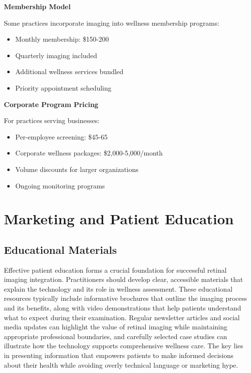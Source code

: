 \documentclass[
  Letterpaper,
]{scrbook}
\providecommand{\tightlist}{%
  \setlength{\itemsep}{0pt}\setlength{\parskip}{0pt}}\usepackage{longtable,booktabs,array}
\begin{document}
\textbf{Membership Model}

Some practices incorporate imaging into wellness membership programs:

\begin{itemize}
\tightlist
\item
  Monthly membership: \$150-200
\item
  Quarterly imaging included
\item
  Additional wellness services bundled
\item
  Priority appointment scheduling
\end{itemize}

\textbf{Corporate Program Pricing}

For practices serving businesses:

\begin{itemize}
\tightlist
\item
  Per-employee screening: \$45-65
\item
  Corporate wellness packages: \$2,000-5,000/month
\item
  Volume discounts for larger organizations
\item
  Ongoing monitoring programs
\end{itemize}

\section{Marketing and Patient
Education}\label{marketing-and-patient-education}

\subsection*{Educational Materials}\label{educational-materials}

Effective patient education forms a crucial foundation for successful
retinal imaging integration. Practitioners should develop clear,
accessible materials that explain the technology and its role in
wellness assessment. These educational resources typically include
informative brochures that outline the imaging process and its benefits,
along with video demonstrations that help patients understand what to
expect during their examination. Regular newsletter articles and social
media updates can highlight the value of retinal imaging while
maintaining appropriate professional boundaries, and carefully selected
case studies can illustrate how the technology supports comprehensive
wellness care. The key lies in presenting information that empowers
patients to make informed decisions about their health while avoiding
overly technical language or marketing hype.
\end{document}
